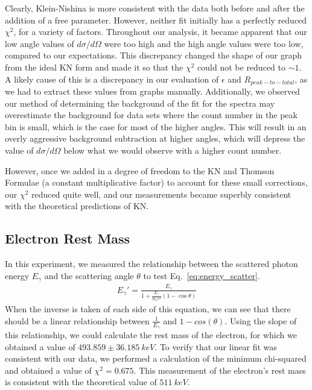 \documentclass[%
 reprint,
 amsmath,amssymb,
 aps,
 pra,
]{revtex4-1}
\begin{document}
\noindent Clearly, Klein-Nishina is more consistent with the data both before and after the addition of a free parameter. However, neither fit initially has a perfectly reduced $\chi^2$, for a variety of factors. Throughout our analysis, it became apparent that our low angle values of $d\sigma / d\Omega$ were too high and the high angle values were too low, compared to our expectations. This discrepancy changed the shape of our graph from the ideal KN form and made it so that the $\chi^2$ could not be reduced to $\sim 1$. A likely cause of this is a discrepancy in our evaluation of $\epsilon$ and $R_{peak-to-total}$, as we had to extract these values from graphs manually. Additionally, we observed our method of determining the background of the fit for the spectra may overestimate the background for data sets where the count number in the peak bin is small, which is the case for most of the higher angles. This will result in an overly aggressive background subtraction at higher angles, which will depress the value of $d\sigma / d\Omega$ below what we would observe with a higher count number.

However, once we added in a degree of freedom to the KN and Thomson Formulae (a constant multiplicative factor) to account for these small corrections, our $\chi^2$ reduced quite well, and our measurements became superbly consistent with the theoretical predictions of KN. 

\subsection{Electron Rest Mass}
In this experiment, we measured the relationship between the scattered photon energy $E_{\gamma}$ and the scattering angle $\theta$ to test Eq.~\ref{eq:energy_scatter}.
\begin{gather*}
	E_\gamma ' = \frac{E_\gamma}{1 + \frac{E_\gamma}{m_e c^2} (1 - \cos{\theta})}
\end{gather*}
When the inverse is taken of each side of this equation, we can see that there should be a linear relationship between $\frac{1}{E_{\gamma}}$ and $1 - cos(\theta)$. Using the slope of this relationship, we could calculate the rest mass of the electron, for which we obtained a value of $493.859 \pm 36.185 ~keV$. To verify that our linear fit was consistent with our data, we performed a calculation of the minimum chi-squared and obtained a value of $\chi^{2} = 0.675$.  This measurement of the electron's rest mass is consistent with the theoretical value of $511~ keV$. 
\end{document}
